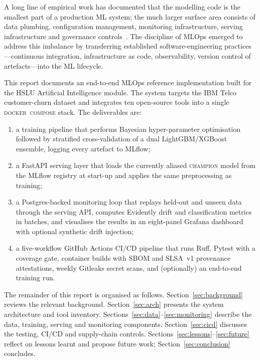 \documentclass[conference,a4paper,10pt]{IEEEtran}
\begin{document}
A long line of empirical work has documented that the modelling code is
the smallest part of a production ML system; the much larger surface
area consists of data plumbing, configuration management, monitoring
infrastructure, serving infrastructure and governance
controls~\cite{sculley2015hidden,paleyes2022deploy}. The discipline of
MLOps emerged to address this imbalance by transferring established
software-engineering practices---continuous integration, infrastructure
as code, observability, version control of artefacts---into the ML
lifecycle.

This report documents an end-to-end MLOps reference implementation
built for the HSLU Artificial Intelligence module. The system targets
the IBM Telco customer-churn dataset and integrates ten open-source
tools into a single \textsc{docker~compose} stack. The deliverables are:
\begin{enumerate}
  \item a training pipeline that performs Bayesian hyper-parameter
        optimisation followed by stratified cross-validation of a dual
        LightGBM/XGBoost ensemble, logging every artefact to MLflow;
  \item a FastAPI serving layer that loads the currently aliased
        \textsc{champion} model from the MLflow registry at start-up and
        applies the same preprocessing as training;
  \item a Postgres-backed monitoring loop that replays held-out and
        unseen data through the serving API, computes Evidently drift
        and classification metrics in batches, and visualises the
        results in an eight-panel Grafana dashboard with optional
        synthetic drift injection;
  \item a five-workflow GitHub Actions CI/CD pipeline that runs Ruff,
        Pytest with a coverage gate, container builds with SBOM and
        SLSA~v1 provenance attestations, weekly Gitleaks secret scans,
        and (optionally) an end-to-end training run.
\end{enumerate}

The remainder of this report is organised as follows.
Section~\ref{sec:background} reviews the relevant background.
Section~\ref{sec:arch} presents the system architecture and tool
inventory. Sections~\ref{sec:data}--\ref{sec:monitoring} describe the
data, training, serving and monitoring components.
Section~\ref{sec:cicd} discusses the testing, CI/CD and supply-chain
controls. Sections~\ref{sec:lessons}--\ref{sec:future} reflect on
lessons learnt and propose future work; Section~\ref{sec:conclusion}
concludes.
\end{document}
